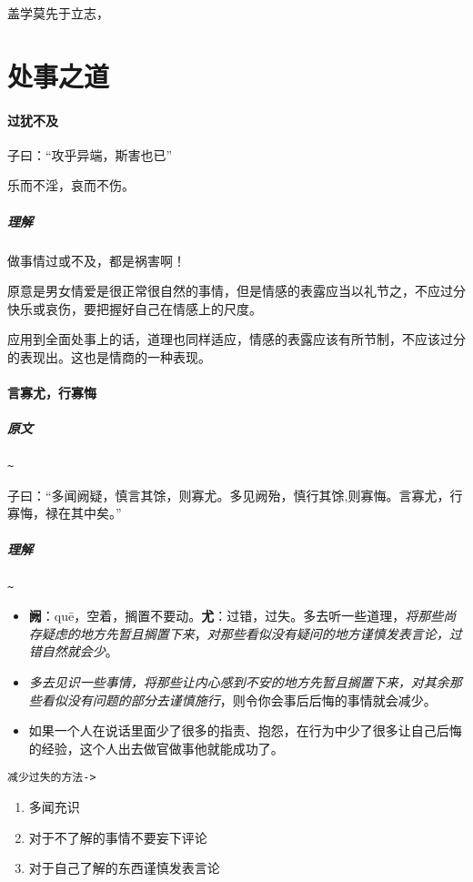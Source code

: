 \documentclass[UTF8,a4paper,8pt]{ctexbook}
\begin{document}
				盖学莫先于立志，		
	\section{处事之道}
		\paragraph{过犹不及}
				子曰：“攻乎异端，斯害也已”
				
				乐而不淫，哀而不伤。
			
			\subparagraph{理解} 做事情过或不及，都是祸害啊！
			
			原意是男女情爱是很正常很自然的事情，但是情感的表露应当以礼节之，不应过分快乐或哀伤，要把握好自己在情感上的尺度。
			
			应用到全面处事上的话，道理也同样适应，情感的表露应该有所节制，不应该过分的表现出。这也是情商的一种表现。		
		
		\paragraph{言寡尤，行寡悔}
			\subparagraph{原文}\verb|~|
			
				子曰：“多闻阙疑，慎言其馀，则寡尤。多见阙殆，慎行其馀,则寡悔。言寡尤，行寡悔，禄在其中矣。”
			
			\subparagraph{理解}\verb|~|
			
				\begin{itemize}[itemindent = 1em]
					\item \textbf{阙}：quē，空着，搁置不要动。\textbf{尤}：过错，过失。多去听一些道理，\textit{将那些尚存疑虑的地方先暂且搁置下来}，\textit{对那些看似没有疑问的地方谨慎发表言论，过错自然就会少}。
					\item \textit{多去见识一些事情，将那些让内心感到不安的地方先暂且搁置下来，对其余那些看似没有问题的部分去谨慎施行}，则令你会事后后悔的事情就会减少。
					\item 如果一个人在说话里面少了很多的指责、抱怨，在行为中少了很多让自己后悔的经验，这个人出去做官做事他就能成功了。
				\end{itemize}
			
			\verb|减少过失的方法->|
				\begin{enumerate}[itemindent =2em]
						\item 多闻充识
						\item 对于不了解的事情不要妄下评论
						\item 对于自己了解的东西谨慎发表言论					
				\end{enumerate}
\end{document}

